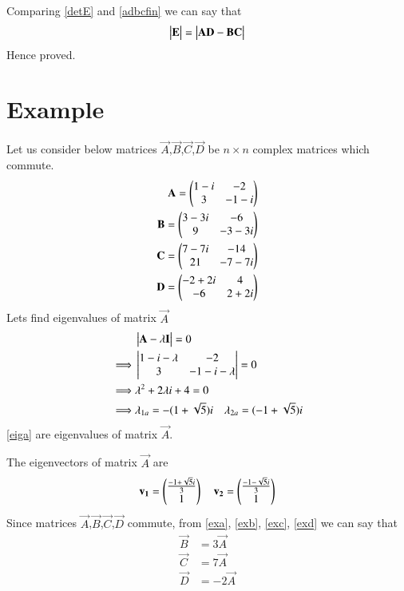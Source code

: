 \documentclass[journal,12pt,twocolumn]{IEEEtran}
\begin{document}
Comparing \eqref{detE} and \eqref{adbcfin} we can say that
\begin{align}
    \begin{vmatrix}\mathbf{E}\end{vmatrix}=\begin{vmatrix}\mathbf{A}\mathbf{D}-\mathbf{B}\mathbf{C}\end{vmatrix}
\end{align}
Hence proved.
\section{\textbf{Example}}
Let us consider below matrices $\vec{A}$,$\vec{B}$,$\vec{C}$,$\vec{D}$ be $n\times n$ complex matrices which commute.
\begin{align}
    \mathbf{A}=\begin{pmatrix}1-i&-2\\3&-1-i\end{pmatrix}\label{exa}\\
    \mathbf{B}=\begin{pmatrix}3-3i&-6\\9&-3-3i\end{pmatrix}\label{exb}\\
    \mathbf{C}=\begin{pmatrix}7-7i&-14\\21&-7-7i\end{pmatrix}\label{exc}\\
    \mathbf{D}=\begin{pmatrix}-2+2i&4\\-6&2+2i\end{pmatrix}\label{exd}
\end{align}
Lets find eigenvalues of matrix $\vec{A}$
\begin{align}
    &\begin{vmatrix}\mathbf{A}-\lambda\mathbf{I}\end{vmatrix}=0\\
    \implies&\begin{vmatrix}1-i-\lambda&-2\\3&-1-i-\lambda\end{vmatrix}=0\\
    \implies&\lambda^2+2\lambda i+4=0\\
    \implies&\lambda_{1a}=-(1+\sqrt{5})i\quad\lambda_{2a}=(-1+\sqrt{5})i\label{eiga}
\end{align}
\eqref{eiga} are eigenvalues of matrix $\vec{A}$.

The eigenvectors of matrix $\vec{A}$ are
\begin{align}
    \mathbf{v_1}=\begin{pmatrix}\frac{-1+\sqrt{5}i}{3}\\1\end{pmatrix}\quad\mathbf{v_2}=\begin{pmatrix}\frac{-1-\sqrt{5}i}{3}\\1\end{pmatrix}
\end{align}
Since matrices $\vec{A}$,$\vec{B}$,$\vec{C}$,$\vec{D}$ commute, from \eqref{exa}, \eqref{exb}, \eqref{exc}, \eqref{exd} we can say that
\begin{align}
    \vec{B}&=3\vec{A}\\
    \vec{C}&=7\vec{A}\\
    \vec{D}&=-2\vec{A}
\end{align}
\end{document}
